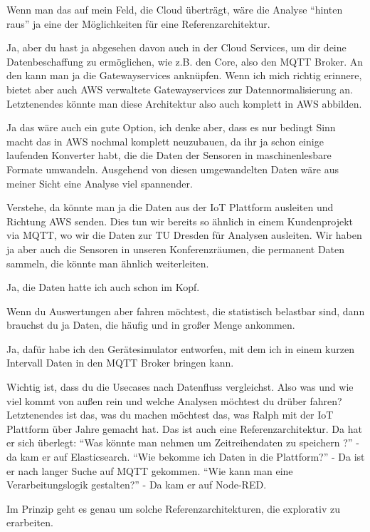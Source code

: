 \LF Wenn man das auf mein Feld, die Cloud überträgt, wäre die Analyse \enquote{hinten raus} ja eine der Möglichkeiten für eine Referenzarchitektur.

\PE Ja, aber du hast ja abgesehen davon auch in der Cloud Services, um dir deine Datenbeschaffung zu ermöglichen, wie z.B. den \AWSIOT{} Core, also den \ac{MQTT} Broker. An den kann man ja die Gatewayservices anknüpfen. Wenn ich mich richtig erinnere, bietet aber auch \ac{AWS} verwaltete Gatewayservices zur Datennormalisierung an. Letztenendes könnte man diese Architektur also auch komplett in \ac{AWS} abbilden.

\LF Ja das wäre auch ein gute Option, ich denke aber, dass es nur bedingt Sinn macht das in \ac{AWS} nochmal komplett neuzubauen, da ihr ja schon einige laufenden Konverter habt, die die Daten der Sensoren in maschinenlesbare Formate umwandeln. Ausgehend von diesen umgewandelten Daten wäre aus meiner Sicht eine Analyse viel spannender.

\PE Verstehe, da könnte man ja die Daten aus der IoT Plattform ausleiten und Richtung \ac{AWS} senden. Dies tun wir bereits so ähnlich in einem Kundenprojekt via \ac{MQTT}, wo wir die Daten zur TU Dresden für Analysen ausleiten. Wir haben ja aber auch die \coo{} Sensoren in unseren Konferenzräumen, die permanent Daten sammeln, die könnte man ähnlich weiterleiten.

\LF Ja, die \coo Daten hatte ich auch schon im Kopf.

\PE Wenn du Auswertungen aber fahren möchtest, die statistisch belastbar sind, dann brauchst du ja Daten, die häufig und in großer Menge ankommen.

\LF Ja, dafür habe ich den Gerätesimulator entworfen, mit dem ich in einem kurzen Intervall Daten in den \ac{MQTT} Broker bringen kann. 

\PE Wichtig ist, dass du die Usecases nach Datenfluss vergleichst. Also was und wie viel kommt von außen rein und welche Analysen möchtest du drüber fahren? Letztenendes ist das, was du machen möchtest das, was Ralph mit der \ac{IoT} Plattform über Jahre gemacht hat. Das ist auch eine Referenzarchitektur. Da hat er sich überlegt: \enquote{Was könnte man nehmen um Zeitreihendaten zu speichern ?} - da kam er auf Elasticsearch. \enquote{Wie bekomme ich Daten in die Plattform?} - Da ist er nach langer Suche auf \ac{MQTT} gekommen. \enquote{Wie kann man eine Verarbeitungslogik gestalten?} - Da kam er auf Node-RED.

\LF Im Prinzip geht es genau um solche Referenzarchitekturen, die explorativ zu erarbeiten. 

